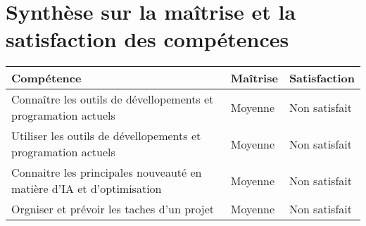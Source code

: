 \section{Synthèse sur la maîtrise et
la satisfaction des compétences}

\begin{tabularx}{15cm}{|X|X|X|}
\hline
\rowcolor{color1}
Compétence & Maîtrise & Satisfaction\\
\hline
 Connaître les outils de  dévellopements et programation actuels & Moyenne & Non satisfait\\
\hline
Utiliser les outils de  dévellopements et programation actuels & Moyenne & Non satisfait\\
\hline
Connaitre les principales nouveauté en matière d'IA et d'optimisation & Moyenne & Non satisfait\\
\hline
Orgniser et prévoir les taches d'un projet  & Moyenne & Non satisfait\\
\hline
\end{tabularx}
